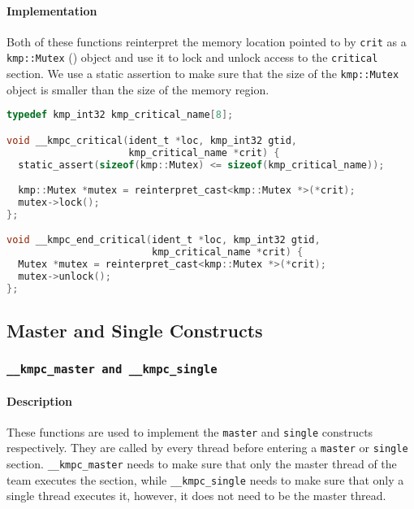 \paragraph{Implementation} Both of these functions reinterpret the memory location pointed to by
\texttt{crit} as a \texttt{kmp::Mutex} () object and use it to lock and unlock access to
the \texttt{critical} section. We use a static assertion to make sure that the size of the
\texttt{kmp::Mutex} object is smaller than the size of the memory region.

\begin{lstlisting}[language=C, caption={__kmpc_critical and __kmpc_end_critical},
                   label={lst:kmpc-critical}, escapechar=@]
typedef kmp_int32 kmp_critical_name[8];

void __kmpc_critical(ident_t *loc, kmp_int32 gtid,
                     kmp_critical_name *crit) {
  static_assert(sizeof(kmp::Mutex) <= sizeof(kmp_critical_name));

  kmp::Mutex *mutex = reinterpret_cast<kmp::Mutex *>(*crit);
  mutex->lock();
};

void __kmpc_end_critical(ident_t *loc, kmp_int32 gtid,
                         kmp_critical_name *crit) {
  Mutex *mutex = reinterpret_cast<kmp::Mutex *>(*crit);
  mutex->unlock();
};
\end{lstlisting}

\subsection{Master and Single Constructs}

\subsubsection{\texttt{__kmpc_master and __kmpc_single}}

\paragraph{Description} These functions are used to implement the \texttt{master} and
\texttt{single} constructs respectively. They are called by every thread before entering a
\texttt{master} or \texttt{single} section. \texttt{\_\_kmpc\_master} needs to make sure that only
the master thread of the team executes the section, while \texttt{\_\_kmpc\_single} needs to make
sure that only a single thread executes it, however, it does not need to be the master thread.

